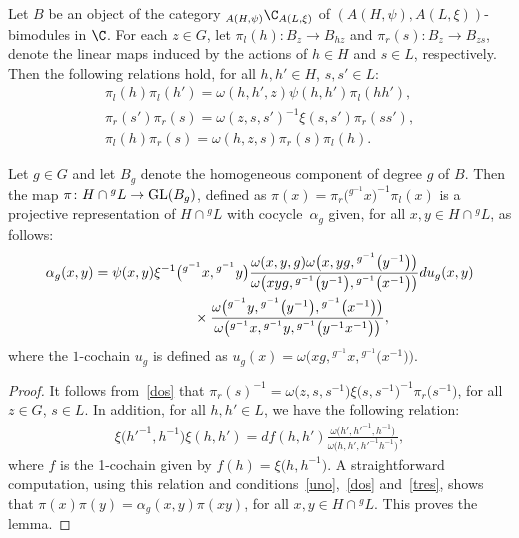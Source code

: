 Let $B$ be an object of the category $_{A(H, \psi)}\C_{A(L, \xi)}$ of $(A(H, \psi), A(L, \xi))$-bimodules in $\C$. For each $z\in G$, let $\pi_l(h)\colon B_z \to B_{hz}$ and $\pi_r(s)\colon B_z \to B_{zs}$, denote the linear maps induced by the actions of $h \in H$ and $s \in L$, respectively. Then the following relations hold, for all $h, h' \in H$, $s, s' \in L$:
\begin{gather}\label{uno}\pi_l(h)\pi_l(h') = \omega(h, h', z) \psi(h, h') \pi_l(hh'), \\
\label{dos}\pi_r(s')\pi_r(s) = \omega(z, s, s')^{-1} \xi(s, s') \pi_r(ss'),\\
\label{tres}\pi_l(h)\pi_r(s) = \omega(h, z, s) \pi_r(s)\pi_l(h).\end{gather}

\begin{Lemma}\label{alfa-g} Let $g \in G$ and let $B_g$ denote the homogeneous component of degree $g$ of $B$. Then the map $\pi\colon H \cap {}^gL \to \text{\rm GL}(B_g)$, defined as $\pi(x) = \pi_r\big({}^{g^{-1}}x\big)^{-1}\pi_l(x)$ is a projective representation of $H \cap {}^gL$ with cocycle~$\alpha_g$ given, for all $x, y \in H \cap {}^gL$, as follows:
\begin{gather*}
\alpha_g(x, y) = \psi(x, y) \xi^{-1}\big({}^{g^{-1}}x, {}^{g^{-1}}y\big) \frac{\omega(x, y, g) \omega\big(x, yg, {}^{g^{-1}}\big(y^{-1}\big)\big)}
{\omega\big(xyg, {}^{g^{-1}}\big(y^{-1}\big),{} ^{g^{-1}}\big(x^{-1}\big)\big)} du_g(x, y) \\
\hphantom{\alpha_g(x, y) =}{} \times \frac{\omega\big({}^{g^{-1} } y, {}^{g^{-1}}\big(y^{-1}\big), {}^{g^{-1}}\big(x^{-1}\big)\big)} {\omega\big({}^{g^{-1}}x, {} ^{g^{-1}}y, {} ^{g^{-1}}\big(y^{-1}x^{-1}\big)\big)},
\end{gather*}
 where the $1$-cochain $u_g$ is defined as $u_g(x) = \omega\big(xg, {} ^{g^{-1}} x, {}^{g^{-1}} \big(x^{-1}\big)\big)$. \end{Lemma}

\begin{proof} It follows from~\eqref{dos} that $\pi_r(s)^{-1} = \omega\big(z, s, s^{-1}\big) \xi\big(s, s^{-1}\big)^{-1} \pi_r\big(s^{-1}\big)$, for all $z\in G$, $s \in L$. In addition, for all $h, h' \in L$, we have the following relation:
\begin{gather*}\xi \big({h'}^{-1}, h^{-1}\big) \xi (h, h') = df(h, h')\frac{\omega\big(h', {h'}^{-1}, h^{-1}\big)}
	{\omega\big(h, h', {h'}^{-1}h^{-1}\big)},\end{gather*}
where $f$ is the 1-cochain given by $f(h) = \xi\big(h, h^{-1}\big)$. A straightforward computation, using this relation and conditions~\eqref{uno},~\eqref{dos} and~\eqref{tres}, shows that $\pi(x) \pi(y) = \alpha_g(x, y) \pi(xy)$, for all $x, y \in H \cap {}^gL$. This proves the lemma. \end{proof}

